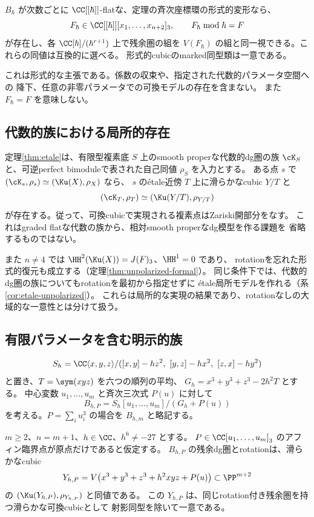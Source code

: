 \begin{corollary}[形式族]\label{cor:formal}
 \(B_\hbar\) が次数ごとに \(\CC[[\hbar]]\)-flatな、定理の斉次座標環の形式的変形なら、
 \[
 F_\hbar\in\CC[[\hbar]][x_1,\ldots,x_{n+2}]_3,\qquad F_\hbar\bmod\hbar=F
 \]
 が存在し、各 \(\CC[\hbar]/(\hbar^{r+1})\) 上で残余圏の組を
 \(V(F_\hbar)\) の組と同一視できる。これらの同値は互換的に選べる。
 形式的cubicのmarked同型類は一意である。
\end{corollary}

これは形式的な主張である。係数の収束や、指定された代数的パラメータ空間への
降下、任意の非零パラメータでの可換モデルの存在を含まない。
また \(F_\hbar=F\) を意味しない。

\subsection{代数的族における局所的存在}

定理\ref{thm:etale}は、有限型複素底 \(S\) 上のsmooth properな代数的dg圏の族
\(\cK_S\) と、可逆perfect bimoduleで表された自己同値 \(\rho_S\) を入力とする。
ある点 \(s\) で \((\cK_s,\rho_s)\simeq(\Ku(X),\rho_X)\) なら、
\(s\) のétale近傍 \(T\) 上に滑らかなcubic \(Y/T\) と
\[
 (\cK_T,\rho_T)\simeq(\Ku(Y/T),\rho_{Y/T})
\]
が存在する。従って、可換cubicで実現される複素点はZariski開部分をなす。
これはgraded flatな代数の族から、相対smooth properなdg模型を作る課題を
省略するものではない。

また \(n\ne4\) では \(\HH^2(\Ku(X))=J(F)_3\)、\(\HH^1=0\) であり、
rotationを忘れた形式的復元も成立する（定理\ref{thm:unpolarized-formal}）。
同じ条件下では、代数的dg圏の族についてもrotationを最初から指定せずに
étale局所モデルを作れる（系\ref{cor:etale-unpolarized}）。
これらは局所的な実現の結果であり、rotationなしの大域的な一意性とは分けて扱う。

\subsection{有限パラメータを含む明示的族}

\[
 S_h=\CC\langle x,y,z\rangle/
 ([x,y]-hz^2,\ [y,z]-hx^2,\ [z,x]-hy^2)
\]
と置き、\(T=\sym(xyz)\) を六つの順列の平均、
\(G_h=x^3+y^3+z^3-2h^2T\) とする。
中心変数 \(u_1,\ldots,u_m\) と斉次三次式 \(P(u)\) に対して
\[
 B_{h,P}=S_h[u_1,\ldots,u_m]/(G_h+P(u))
\]
を考える。\(P=\sum_i u_i^3\) の場合を \(B_{h,m}\) と略記する。

\begin{theorem}[一ブロックと任意の中心三次式の可換モデル]\label{thm:global}
 \(m\ge2\)、\(n=m+1\)、\(h\in\CC\)、\(h^6\ne-27\) とする。
 \(P\in\CC[u_1,\ldots,u_m]_3\) のアフィン臨界点が原点だけであると仮定する。
 \(B_{h,P}\) の残余dg圏とrotationは、滑らかなcubic
 \[
 Y_{h,P}=V\!\left(x^3+y^3+z^3+h^2xyz+P(u)\right)
 \subset\PP^{m+2}
 \]
 の \((\Ku(Y_{h,P}),\rho_{Y_{h,P}})\) と同値である。
 この \(Y_{h,P}\) は、同じrotation付き残余圏を持つ滑らかな可換cubicとして
 射影同型を除いて一意である。
\end{theorem}

